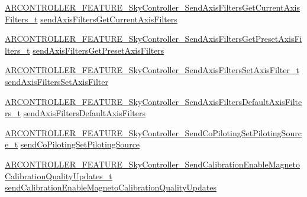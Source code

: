 \begin{DoxyCompactItemize}
\item 
\hyperlink{_a_r_c_o_n_t_r_o_l_l_e_r___feature_8h_a9594e016940035320fe89c22d6727496}{A\+R\+C\+O\+N\+T\+R\+O\+L\+L\+E\+R\+\_\+\+F\+E\+A\+T\+U\+R\+E\+\_\+\+Sky\+Controller\+\_\+\+Send\+Axis\+Filters\+Get\+Current\+Axis\+Filters\+\_\+t} \hyperlink{struct_a_r_c_o_n_t_r_o_l_l_e_r___f_e_a_t_u_r_e___sky_controller__t_a85f49b8378db0f5a82681ac922891dc9}{send\+Axis\+Filters\+Get\+Current\+Axis\+Filters}
\item 
\hyperlink{_a_r_c_o_n_t_r_o_l_l_e_r___feature_8h_a3aaa59daef58d166881574ac8608a172}{A\+R\+C\+O\+N\+T\+R\+O\+L\+L\+E\+R\+\_\+\+F\+E\+A\+T\+U\+R\+E\+\_\+\+Sky\+Controller\+\_\+\+Send\+Axis\+Filters\+Get\+Preset\+Axis\+Filters\+\_\+t} \hyperlink{struct_a_r_c_o_n_t_r_o_l_l_e_r___f_e_a_t_u_r_e___sky_controller__t_a9ff571e260476d7022fb3dbd9fd49164}{send\+Axis\+Filters\+Get\+Preset\+Axis\+Filters}
\item 
\hyperlink{_a_r_c_o_n_t_r_o_l_l_e_r___feature_8h_a75c4419c486fd61819053602ff6ca209}{A\+R\+C\+O\+N\+T\+R\+O\+L\+L\+E\+R\+\_\+\+F\+E\+A\+T\+U\+R\+E\+\_\+\+Sky\+Controller\+\_\+\+Send\+Axis\+Filters\+Set\+Axis\+Filter\+\_\+t} \hyperlink{struct_a_r_c_o_n_t_r_o_l_l_e_r___f_e_a_t_u_r_e___sky_controller__t_af0462522dbcf14b148d32b32587e4b3d}{send\+Axis\+Filters\+Set\+Axis\+Filter}
\item 
\hyperlink{_a_r_c_o_n_t_r_o_l_l_e_r___feature_8h_adb750d2d3ef15956b67fccd4f48ca294}{A\+R\+C\+O\+N\+T\+R\+O\+L\+L\+E\+R\+\_\+\+F\+E\+A\+T\+U\+R\+E\+\_\+\+Sky\+Controller\+\_\+\+Send\+Axis\+Filters\+Default\+Axis\+Filters\+\_\+t} \hyperlink{struct_a_r_c_o_n_t_r_o_l_l_e_r___f_e_a_t_u_r_e___sky_controller__t_a44ad893c08daebbac616128fe2bb4684}{send\+Axis\+Filters\+Default\+Axis\+Filters}
\item 
\hyperlink{_a_r_c_o_n_t_r_o_l_l_e_r___feature_8h_a1705bcc6781880b6058ee01a958a6db5}{A\+R\+C\+O\+N\+T\+R\+O\+L\+L\+E\+R\+\_\+\+F\+E\+A\+T\+U\+R\+E\+\_\+\+Sky\+Controller\+\_\+\+Send\+Co\+Piloting\+Set\+Piloting\+Source\+\_\+t} \hyperlink{struct_a_r_c_o_n_t_r_o_l_l_e_r___f_e_a_t_u_r_e___sky_controller__t_a7b3728b893686d2f7f820a5c5f3f0289}{send\+Co\+Piloting\+Set\+Piloting\+Source}
\item 
\hyperlink{_a_r_c_o_n_t_r_o_l_l_e_r___feature_8h_a99dfa2c140dc467607f8f2bcf082a1af}{A\+R\+C\+O\+N\+T\+R\+O\+L\+L\+E\+R\+\_\+\+F\+E\+A\+T\+U\+R\+E\+\_\+\+Sky\+Controller\+\_\+\+Send\+Calibration\+Enable\+Magneto\+Calibration\+Quality\+Updates\+\_\+t} \hyperlink{struct_a_r_c_o_n_t_r_o_l_l_e_r___f_e_a_t_u_r_e___sky_controller__t_a6d2b2b39d37191e8dcd8b1f9033a9105}{send\+Calibration\+Enable\+Magneto\+Calibration\+Quality\+Updates}

\end{DoxyCompactItemize}
